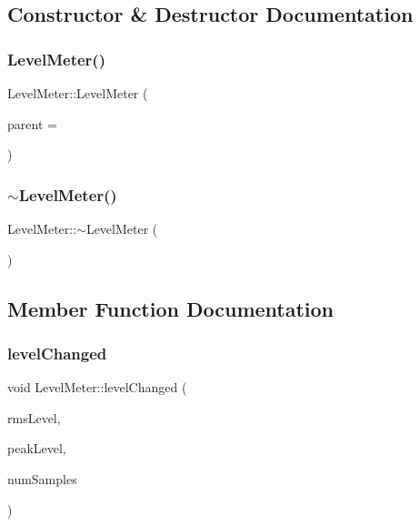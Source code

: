 \subsection{Constructor \& Destructor Documentation}
\hypertarget{class_level_meter_addf17c9ccc12cfab6389a5170c5f9a49}{}\label{class_level_meter_addf17c9ccc12cfab6389a5170c5f9a49} 
\subsubsection{\texorpdfstring{Level\+Meter()}{LevelMeter()}}
{\footnotesize\ttfamily Level\+Meter\+::\+Level\+Meter (\begin{DoxyParamCaption}\item[{Q\+Object $\ast$}]{parent = {} }\end{DoxyParamCaption})\hspace{0.3cm}{\ttfamily [explicit]}}

\hypertarget{class_level_meter_a28a42090bec996fdda8e804828b49b4c}{}\label{class_level_meter_a28a42090bec996fdda8e804828b49b4c} 
\subsubsection{\texorpdfstring{$\sim$\+Level\+Meter()}{~LevelMeter()}}
{\footnotesize\ttfamily Level\+Meter\+::$\sim$\+Level\+Meter (\begin{DoxyParamCaption}{ }\end{DoxyParamCaption})}



\subsection{Member Function Documentation}
\hypertarget{class_level_meter_a5aabf54c24c8651ea834b4e8f404d5e4}{}\label{class_level_meter_a5aabf54c24c8651ea834b4e8f404d5e4} 
\subsubsection{\texorpdfstring{level\+Changed}{levelChanged}}
{\footnotesize\ttfamily void Level\+Meter\+::level\+Changed (\begin{DoxyParamCaption}\item[{qreal}]{rms\+Level,  }\item[{qreal}]{peak\+Level,  }\item[{int}]{num\+Samples }\end{DoxyParamCaption})\hspace{0.3cm}{\ttfamily [slot]}}

